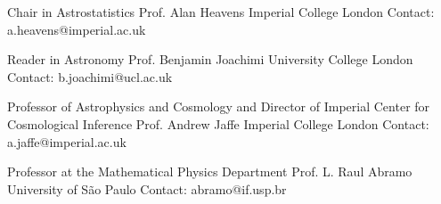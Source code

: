

\begin{cventries}

  \cventry
    {Chair in Astrostatistics} %
    {Prof. Alan Heavens} %
    {Imperial College London} %
    {} %
    {
      Contact: {a.heavens@imperial.ac.uk}
    }

  \cventry
    {Reader in Astronomy} %
    {Prof. Benjamin Joachimi} %
    {University College London} %
    {} %
    {
      Contact: {b.joachimi@ucl.ac.uk}
    }
    
%

  \cventry
    {Professor of Astrophysics and Cosmology and Director of Imperial Center for Cosmological Inference} %
    {Prof. Andrew Jaffe} %
    {Imperial College London} %
    {} %
    {
      Contact: {a.jaffe@imperial.ac.uk}
    }


  \cventry
    {Professor at the Mathematical Physics Department} %
    {Prof. L. Raul Abramo} %
    {University of São Paulo} %
    {} %
    {
     Contact: abramo@if.usp.br 
     }

\end{cventries}